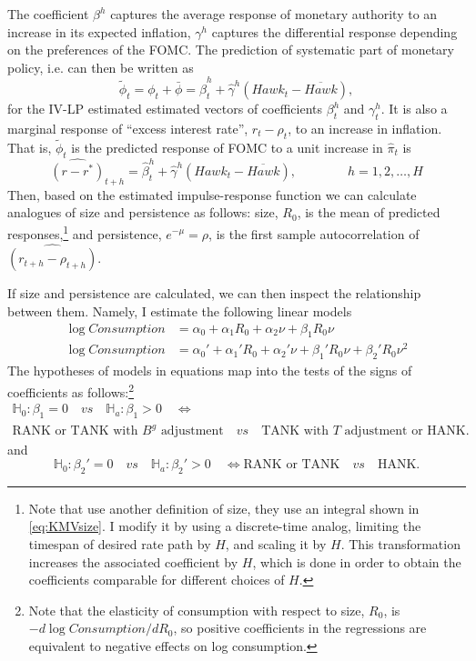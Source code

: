 \documentclass[12pt]{article}
\numberwithin{equation}{section}
\begin{document}
The coefficient $\beta^h$ captures the average response of monetary authority to an increase in its expected inflation, $\gamma^h$ captures the differential response depending on the preferences of the FOMC. The prediction of systematic part of monetary policy, i.e. can then be written as 
\[\tilde \phi_t=\phi_t+\bar\phi=\hat \beta_t^h+\hat\gamma^h \left(\mathit{Hawk}_{t}-\overline{\mathit{Hawk}}\right),\]
for the IV-LP estimated estimated vectors of coefficients $\beta_t^h$ and $\gamma_t^h$. It is also a marginal response of ``excess interest rate'', $r_t-\rho_t$, to an increase in inflation. 
That is, $\tilde \phi_t$ is the predicted response of FOMC to a unit increase in $\hat\pi_t$ is 
\begin{equation}
   \widehat{\left(r-r^*\right)}_{t+h}=\hat \beta_t^h+\hat\gamma^h \left(\mathit{Hawk}_{t}-\overline{\mathit{Hawk}}\right),\qquad\qquad h=1,2,\dots, H\label{eq:pred_policy}
\end{equation}
Then, based on the estimated impulse-response function we can calculate analogues of size and persistence as follows: size, $R_0$, is the mean of predicted responses,\footnote{Note that \cite{KMV2018} use another definition of size, they use an integral shown in \vref{eq:KMVsize}. I modify it by using a discrete-time analog, limiting the timespan of desired rate path by $H$, and scaling it by $H$. This transformation increases the associated coefficient by $H$, which is done in order to obtain the coefficients comparable for different choices of $H$.} and persistence, $e^{-\mu}=\rho$, is the first sample autocorrelation of $\widehat{\left(r_{t+h}-\rho_{t+h}\right)}$.

If size and persistence are calculated, we can then inspect the relationship between them. Namely, I estimate the following linear models 
\begin{align}
    \log \mathit{Consumption}&=\alpha_0+\alpha_1 R_0+\alpha_2\nu+\beta_1 R_0\nu \label{eq:linear}\\
    \log \mathit{Consumption}&=\alpha_0'+\alpha_1' R_0+\alpha_2'\nu+\beta_1' R_0\nu + \beta_2' R_0\nu^2\label{eq:quadratic}
\end{align} 
The hypotheses of models in equations  map into the tests of the signs of coefficients as follows:\footnote{Note that the elasticity of consumption with respect to size, $R_0$, is $-d\log \mathit{Consumption}/d R_0$, so positive coefficients in the regressions are equivalent to negative effects on log consumption.} 
\begin{multline*}\mathbb{H}_0:\beta_1=0\quad\mathit{vs}\quad \mathbb{H}_a:\beta_1>0\quad\iff\\  \text{RANK or TANK with $B^g$ adjustment}\quad\mathit{vs}\quad \text{TANK with $T$ adjustment or HANK}.\end{multline*}
and
\[\mathbb{H}_0:\beta_2'=0\quad\mathit{vs}\quad \mathbb{H}_a:\beta_2'>0\quad\iff \text{RANK or TANK}\quad\mathit{vs}\quad \text{HANK}.\]
\end{document}
